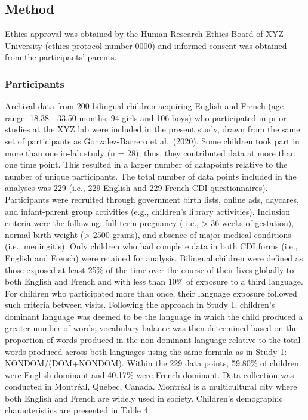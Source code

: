\documentclass[
  english,
  ,man,floatsintext]{apa6}
\begin{document}
\hypertarget{method}{%
\subsection{Method}\label{method}}

Ethics approval was obtained by the Human Research Ethics Board of XYZ University (ethics protocol number 0000) and informed consent was obtained from the participants' parents.

\hypertarget{participants}{%
\subsubsection{Participants}\label{participants}}

Archival data from 200 bilingual children acquiring English and French (age range: 18.38 - 33.50 months; 94 girls and 106 boys) who participated in prior studies at the XYZ lab were included in the present study, drawn from the same set of participants as Gonzalez-Barrero et al.~(2020). Some children took part in more than one in-lab study (n = 28); thus, they contributed data at more than one time point. This resulted in a larger number of datapoints relative to the number of unique participants. The total number of data points included in the analyses was 229 (i.e., 229 English and 229 French CDI questionnaires). Participants were recruited through government birth lists, online ads, daycares, and infant-parent group activities (e.g., children's library activities). Inclusion criteria were the following: full term-pregnancy ( i.e., \textgreater{} 36 weeks of gestation), normal birth weight (\textgreater{} 2500 grams), and absence of major medical conditions (i.e., meningitis). Only children who had complete data in both CDI forms (i.e., English and French) were retained for analysis. Bilingual children were defined as those exposed at least 25\% of the time over the course of their lives globally to both English and French and with less than 10\% of exposure to a third language. For children who participated more than once, their language exposure followed such criteria between visits. Following the approach in Study 1, children's dominant language was deemed to be the language in which the child produced a greater number of words; vocabulary balance was then determined based on the proportion of words produced in the non-dominant language relative to the total words produced across both languages using the same formula as in Study 1: NONDOM/(DOM+NONDOM). Within the 229 data points, 59.80\% of children were English-dominant and 40.17\% were French-dominant. Data collection was conducted in Montréal, Québec, Canada. Montréal is a multicultural city where both English and French are widely used in society. Children's demographic characteristics are presented in Table 4.
\end{document}
